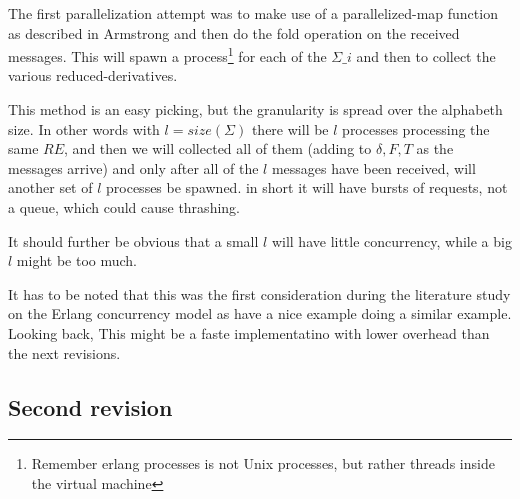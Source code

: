 \documentclass[a4paper,11pt]{report}
\begin{document}
The first parallelization attempt was to make use of a
parallelized-map function as described in Armstrong\cite{PRagmatic} and
then do the fold operation on the received messages. This will spawn a
process\footnote{Remember erlang processes is not Unix processes, but
	rather threads inside the virtual machine} for each of the
$\Sigma\_i$ and then to collect the various reduced-derivatives.

This method is an easy picking, but the granularity is spread
over the alphabeth size. In other words with $l=size(\Sigma)$ there
will be $l$ processes processing the same $RE$, and then we will
collected all of them (adding to $\delta,F,T$ as the messages arrive)
and only after all of the $l$ messages have been received, will
another set of $l$ processes be spawned. in short it will have bursts
of requests, not a queue, which could cause thrashing.

It should further be obvious that a small $l$ will have little
concurrency, while a big $l$ might be too much. 

It has to be noted that this was the first consideration during the
literature study on the Erlang concurrency model as \cite{Pragmatic}
have a nice example doing a similar example. Looking back, This might
be a faste implementatino with lower overhead than the next revisions.

\subsection{Second revision}
\end{document}
